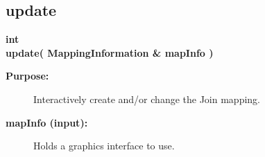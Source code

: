 \subsection{update}
 
\begin{flushleft} \textbf{%
int  \\ 
\settowidth{\JoinMappingIncludeArgIndent}{update(}%
update( MappingInformation \& mapInfo ) 
}\end{flushleft}
\begin{description}
\item[{\bf Purpose:}]  Interactively create and/or change the Join mapping.
\item[{\bf mapInfo (input):}]  Holds a graphics interface to use.
\end{description}

